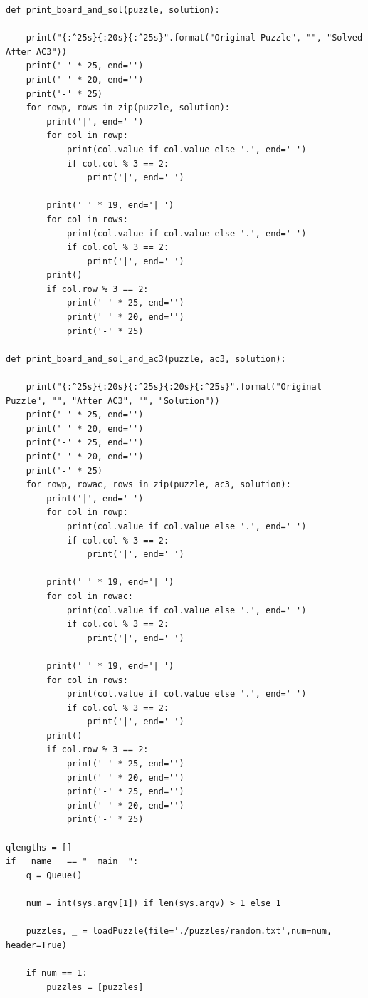 \documentclass{article}
\begin{document}
\begin{verbatim}
def print_board_and_sol(puzzle, solution):

    print("{:^25s}{:20s}{:^25s}".format("Original Puzzle", "", "Solved After AC3"))
    print('-' * 25, end='')
    print(' ' * 20, end='')
    print('-' * 25)
    for rowp, rows in zip(puzzle, solution):
        print('|', end=' ')
        for col in rowp:
            print(col.value if col.value else '.', end=' ')
            if col.col % 3 == 2:
                print('|', end=' ')

        print(' ' * 19, end='| ')
        for col in rows:
            print(col.value if col.value else '.', end=' ')
            if col.col % 3 == 2:
                print('|', end=' ')
        print()
        if col.row % 3 == 2:
            print('-' * 25, end='')
            print(' ' * 20, end='')
            print('-' * 25)

def print_board_and_sol_and_ac3(puzzle, ac3, solution):

    print("{:^25s}{:20s}{:^25s}{:20s}{:^25s}".format("Original Puzzle", "", "After AC3", "", "Solution"))
    print('-' * 25, end='')
    print(' ' * 20, end='')
    print('-' * 25, end='')
    print(' ' * 20, end='')
    print('-' * 25)
    for rowp, rowac, rows in zip(puzzle, ac3, solution):
        print('|', end=' ')
        for col in rowp:
            print(col.value if col.value else '.', end=' ')
            if col.col % 3 == 2:
                print('|', end=' ')

        print(' ' * 19, end='| ')
        for col in rowac:
            print(col.value if col.value else '.', end=' ')
            if col.col % 3 == 2:
                print('|', end=' ')

        print(' ' * 19, end='| ')
        for col in rows:
            print(col.value if col.value else '.', end=' ')
            if col.col % 3 == 2:
                print('|', end=' ')
        print()
        if col.row % 3 == 2:
            print('-' * 25, end='')
            print(' ' * 20, end='')
            print('-' * 25, end='')
            print(' ' * 20, end='')
            print('-' * 25)

qlengths = []
if __name__ == "__main__":
    q = Queue()

    num = int(sys.argv[1]) if len(sys.argv) > 1 else 1

    puzzles, _ = loadPuzzle(file='./puzzles/random.txt',num=num, header=True)

    if num == 1:
        puzzles = [puzzles]


\end{verbatim}
\end{document}

